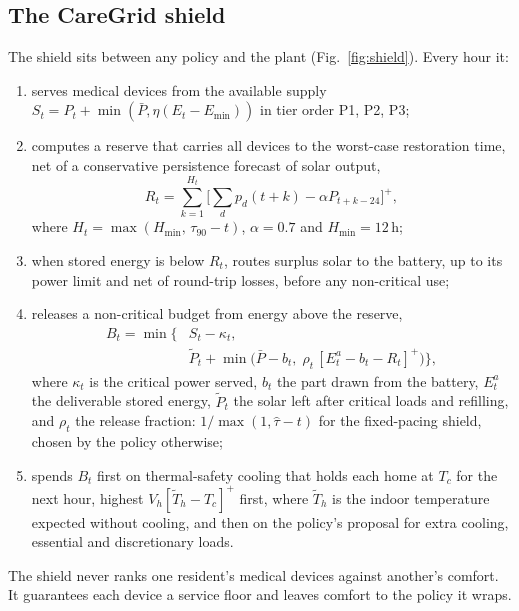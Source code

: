 \documentclass[conference]{IEEEtran}
\begin{document}
\subsection{The CareGrid shield}
The shield sits between any policy and the plant (Fig.~\ref{fig:shield}). Every hour it:
\begin{enumerate}
\item serves medical devices from the available supply $S_t = P_t + \min(\bar P, \eta(E_t - E_{\min}))$ in tier order P1, P2, P3;
\item computes a reserve that carries all devices to the worst-case restoration time, net of a conservative persistence forecast of solar output,
\begin{equation}
R_t = \sum_{k=1}^{H_t}\Big[\textstyle\sum_{d} p_d(t+k) - \alpha P_{t+k-24}\Big]^+,
\end{equation}
where $H_t=\max(H_{\min},\,\tau_{90}-t)$, $\alpha=0.7$ and $H_{\min}=12$\,h;
\item when stored energy is below $R_t$, routes surplus solar to the battery, up to its power limit and net of round-trip losses, before any non-critical use;
\item releases a non-critical budget from energy above the reserve,
\begin{equation}
\begin{aligned}B_t=\min\!\Big\{&S_t-\kappa_t,\\ &\tilde P_t+\min\!\big(\bar P-b_t,\;\rho_t\,[E^{a}_t-b_t-R_t]^+\big)\Big\},\end{aligned}
\end{equation}
where $\kappa_t$ is the critical power served, $b_t$ the part drawn from the battery, $E^{a}_t$ the deliverable stored energy, $\tilde P_t$ the solar left after critical loads and refilling, and $\rho_t$ the release fraction: $1/\max(1,\hat\tau-t)$ for the fixed-pacing shield, chosen by the policy otherwise;
\item spends $B_t$ first on thermal-safety cooling that holds each home at $T_c$ for the next hour, highest $V_h[\tilde T_h-T_c]^+$ first, where $\tilde T_h$ is the indoor temperature expected without cooling, and then on the policy's proposal for extra cooling, essential and discretionary loads.
\end{enumerate}
The shield never ranks one resident's medical devices against another's comfort. It guarantees each device a service floor and leaves comfort to the policy it wraps.
\end{document}
